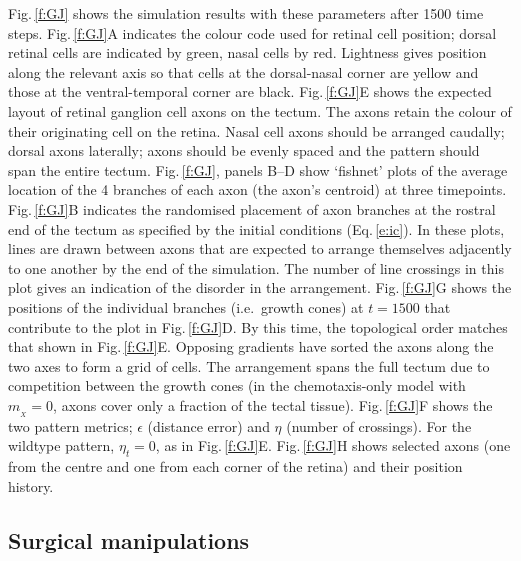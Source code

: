 \documentclass[9pt,lineno,draft]{elife}
\begin{document}
Fig.\,\ref{f:GJ} shows the simulation results with these parameters after 1500 time steps.
Fig.\,\ref{f:GJ}A indicates the colour code used for retinal cell position; dorsal retinal cells are indicated by green, nasal cells by red. Lightness gives position along the relevant axis so that cells at the dorsal-nasal corner are yellow and those at the ventral-temporal corner are black.
Fig.\,\ref{f:GJ}E shows the expected layout of retinal ganglion cell axons on the tectum.
The axons retain the colour of their originating cell on the retina.
Nasal cell axons should be arranged caudally; dorsal axons laterally; axons should be evenly spaced and the pattern should span the entire tectum.
Fig.\,\ref{f:GJ}, panels B--D show `fishnet' plots of the average location of the 4 branches of each axon (the axon's centroid) at three timepoints.
Fig.\,\ref{f:GJ}B indicates the randomised placement of axon branches at the rostral end of the tectum as specified by the initial conditions (Eq.\,\ref{e:ic}).
In these plots, lines are drawn between axons that are expected to arrange themselves adjacently to one another by the end of the simulation.
The number of line crossings in this plot gives an indication of the disorder in the arrangement.
Fig.\,\ref{f:GJ}G shows the positions of the individual branches (i.e.~growth cones) at $t=1500$ that contribute to the plot in Fig.\,\ref{f:GJ}D.
By this time, the topological order matches that shown in Fig.\,\ref{f:GJ}E.
Opposing gradients have sorted the axons along the two axes to form a grid of cells.
The arrangement spans the full tectum due to competition between the growth cones (in the chemotaxis-only model with $m_{\!_X}=0$, axons cover only a fraction of the tectal tissue).
Fig.\,\ref{f:GJ}F shows the two pattern metrics; $\epsilon$ (distance error) and $\eta$ (number of crossings).
For the wildtype pattern, $\eta_t=0$, as in Fig.\,\ref{f:GJ}E.
Fig.\,\ref{f:GJ}H shows selected axons (one from the centre and one from each corner of the retina) and their position history.

\subsection*{Surgical manipulations}
\end{document}
